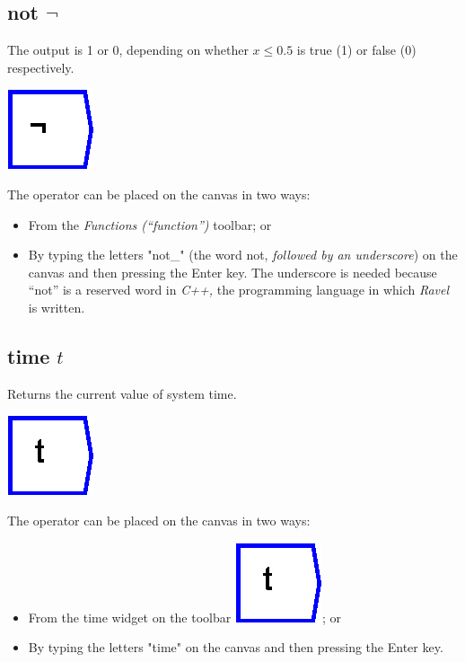 \subsection{not $\neg$}

\label{Operation:not_} The output is 1 or 0, depending on whether
$x\le0.5$ is true (1) or false (0) respectively.

\includegraphics{images/not}

The operator can be placed on the canvas in two ways:
\begin{itemize}
\item From the \emph{Functions (``function'')} toolbar; or 
\item By typing the letters "not\_" (the word not, \emph{followed by an
underscore}) on the canvas and then pressing the Enter key. The underscore
is needed because ``not'' is a reserved word in \emph{C++,} the
programming language in which \emph{Ravel} is written.
\end{itemize}

\subsection{time $t$}

\label{Operation:time} Returns the current value of system time.

\includegraphics{images/time}

The operator can be placed on the canvas in two ways:
\begin{itemize}
\item From the time widget on the toolbar \includegraphics{images/time};
or 
\item By typing the letters "time" on the canvas and then pressing the
Enter key.
\end{itemize}

